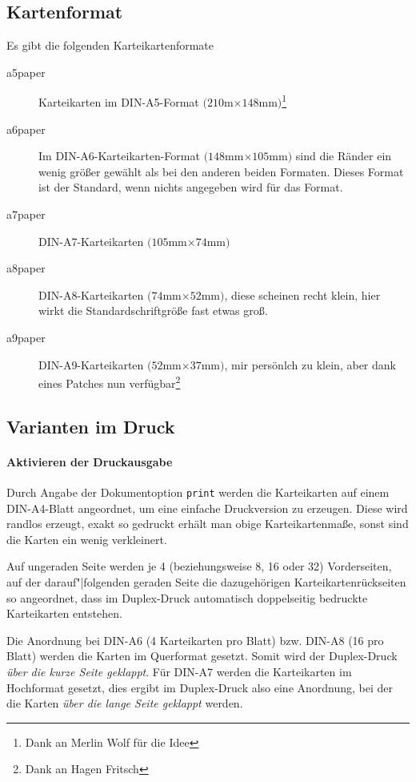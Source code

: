 \documentclass[a4paper,DIV=calc]{scrartcl}
\newcommand{\befehl}[1]{%
\marginpar{\textsf{#1}}%
}
\begin{document}
\subsection{Kartenformat}
\befehl{aXpaper}
Es gibt die folgenden Karteikartenformate
\begin{description}
	\item[a5paper] Karteikarten im DIN-A5-Format $(210$m$\times 148$mm$)$\footnote{Dank an Merlin Wolf für die Idee}
	\item[a6paper] Im DIN-A6-Karteikarten-Format $(148$mm$\times 105$mm$)$ sind die Ränder ein wenig größer gewählt als bei den anderen beiden Formaten. Dieses Format ist der Standard, wenn nichts angegeben wird für das Format.
	\item[a7paper] DIN-A7-Karteikarten $(105$mm$\times 74$mm$)$
	\item[a8paper] DIN-A8-Karteikarten $(74$mm$\times 52$mm$)$, diese scheinen recht klein, hier wirkt die Standardschriftgröße fast etwas groß.
	\item[a9paper] DIN-A9-Karteikarten $(52$mm$\times 37$mm$)$, mir persönlch zu klein, aber dank eines Patches nun verfügbar\footnote{Dank an Hagen Fritsch}
\end{description}
\subsection{Varianten im Druck}\befehl{print}
\paragraph{Aktivieren der Druckausgabe}
Durch Angabe der Dokumentoption \lstinline!print! werden die Karteikarten auf einem DIN-A4-Blatt angeordnet, um eine einfache Druckversion zu erzeugen. Diese wird randlos erzeugt, exakt so gedruckt erhält man obige Karteikartenmaße, sonst sind die Karten ein wenig verkleinert.

Auf ungeraden Seite werden je 4 (beziehungsweise 8, 16 oder 32) Vorderseiten, auf der darauf"|folgenden geraden Seite die dazugehörigen Karteikartenrückseiten so angeordnet, dass im Duplex-Druck automatisch doppelseitig bedruckte Karteikarten entstehen.

Die Anordnung bei DIN-A6 (4 Karteikarten pro Blatt) bzw. DIN-A8 (16 pro Blatt) werden die Karten im Querformat gesetzt. Somit wird der Duplex-Druck  \emph{über die kurze Seite geklappt}. Für DIN-A7 werden die Karteikarten im Hochformat gesetzt, dies ergibt im Duplex-Druck also eine Anordnung, bei der die Karten \emph{über die lange Seite geklappt} werden.
\end{document}
